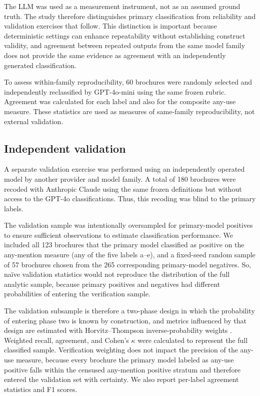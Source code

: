 \documentclass[utf8]{FrontiersinHarvard}
\begin{document}
The LLM was used as a measurement instrument, not as an assumed ground truth. The study therefore distinguishes primary classification from reliability and validation exercises that follow. This distinction is important because deterministic settings can enhance repeatability without establishing construct validity, and agreement between repeated outputs from the same model family does not provide the same evidence as agreement with an independently generated classification.

To assess within-family reproducibility, 60 brochures were randomly selected and independently reclassified by GPT-4o-mini using the same frozen rubric. Agreement was calculated for each label and also for the composite any-use measure. These statistics are used as measures of same-family reproducibility, not external validation.

\subsection{Independent validation}

A separate validation exercise was performed using an independently operated model by another provider and model family. A total of 180 brochures were recoded with Anthropic Claude using the same frozen definitions but without access to the GPT-4o classifications. Thus, this recoding was blind to the primary labels.

The validation sample was intentionally oversampled for primary-model positives to ensure sufficient observations to estimate classification performance. We included all 123 brochures that the primary model classified as positive on the any-mention measure (any of the five labels a--e), and a fixed-seed random sample of 57 brochures chosen from the 265 corresponding primary-model negatives. So, na\"ive validation statistics would not reproduce the distribution of the full analytic sample, because primary positives and negatives had different probabilities of entering the verification sample.

The validation subsample is therefore a two-phase design in which the probability of entering phase two is known by construction, and metrics influenced by that design are estimated with Horvitz--Thompson inverse-probability weights \citep{horvitz1952,breslow1988}. Weighted recall, agreement, and Cohen's $\kappa$ \citep{cohen1960} were calculated to represent the full classified sample. Verification weighting does not impact the precision of the any-use measure, because every brochure the primary model labeled as any-use positive falls within the censused any-mention positive stratum and therefore entered the validation set with certainty. We also report per-label agreement statistics and F1 scores.
\end{document}
